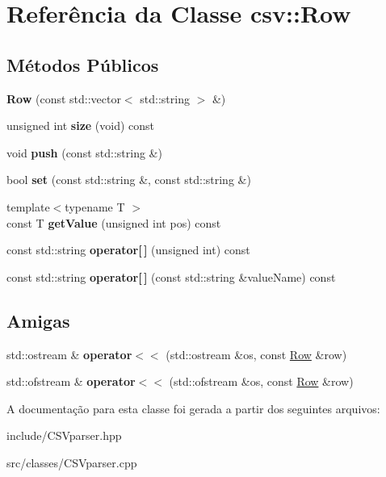 \hypertarget{classcsv_1_1Row}{}\section{Referência da Classe csv\+:\+:Row}
\label{classcsv_1_1Row}
\subsection*{Métodos Públicos}
\begin{DoxyCompactItemize}
\item 
\mbox{\label{classcsv_1_1Row_ae8eafed936af5e605d46c5dbc2e50218}} 
{\bfseries Row} (const std\+::vector$<$ std\+::string $>$ \&)
\item 
\mbox{\label{classcsv_1_1Row_ace79ec6779c708e4cb39470d3bb9f61d}} 
unsigned int {\bfseries size} (void) const
\item 
\mbox{\label{classcsv_1_1Row_a657608d3d8fc04b17253a503f23afd73}} 
void {\bfseries push} (const std\+::string \&)
\item 
\mbox{\label{classcsv_1_1Row_a79fd93afb3b7e74f807e1e0484515e13}} 
bool {\bfseries set} (const std\+::string \&, const std\+::string \&)
\item 
\mbox{\label{classcsv_1_1Row_ab300d0b96a07657c5ca5ae33a1160e1a}} 
{\footnotesize template$<$typename T $>$ }\\const T {\bfseries get\+Value} (unsigned int pos) const
\item 
\mbox{\label{classcsv_1_1Row_af9e4a37e5f6e63ebeaf6c153d6ae8afe}} 
const std\+::string {\bfseries operator\mbox{[}$\,$\mbox{]}} (unsigned int) const
\item 
\mbox{\label{classcsv_1_1Row_af3fa9f8447d6d70fd148dcf87d866d66}} 
const std\+::string {\bfseries operator\mbox{[}$\,$\mbox{]}} (const std\+::string \&value\+Name) const
\end{DoxyCompactItemize}
\subsection*{Amigas}
\begin{DoxyCompactItemize}
\item 
\mbox{\label{classcsv_1_1Row_ad07b377993b0af211415f60c91ea351a}} 
std\+::ostream \& {\bfseries operator$<$$<$} (std\+::ostream \&os, const \hyperlink{classcsv_1_1Row}{Row} \&row)
\item 
\mbox{\label{classcsv_1_1Row_a3b0a724d6cee076c9beb79ad893acb55}} 
std\+::ofstream \& {\bfseries operator$<$$<$} (std\+::ofstream \&os, const \hyperlink{classcsv_1_1Row}{Row} \&row)
\end{DoxyCompactItemize}


A documentação para esta classe foi gerada a partir dos seguintes arquivos\+:\begin{DoxyCompactItemize}
\item 
include/C\+S\+Vparser.\+hpp\item 
src/classes/C\+S\+Vparser.\+cpp\end{DoxyCompactItemize}
